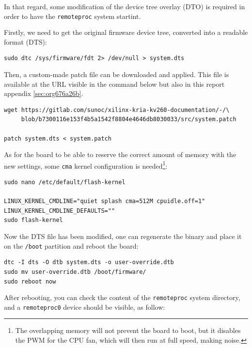 \documentclass[10pt]{article}
\begin{document}
In that regard, some modification of the device tree overlay (DTO) is required in order to have
the \texttt{remoteproc} system startint.

Firstly, we need to get the original firmware device tree, converted
into a readable format (DTS):

\begin{verbatim}
sudo dtc /sys/firmware/fdt 2> /dev/null > system.dts
\end{verbatim}

Then, a custom-made patch file can be downloaded and applied.
This file is available at the URL visible in the command below
but also in this report appendix \ref{sec:org676a26b}.

\begin{verbatim}
wget https://gitlab.com/sunoc/xilinx-kria-kv260-documentation/-/\
     blob/b7300116e153f4b5a1542f8804e4646db8030033/src/system.patch

patch system.dts < system.patch
\end{verbatim}

As for the board to be able to reserve the correct amount of memory with the new settings, some
\texttt{cma} kernel configuration is needed\footnote{The overlapping memory will not prevent the board to boot,
but it disables the PWM for the CPU fan, which will then run at full speed, making noise.}:

\begin{verbatim}
sudo nano /etc/default/flash-kernel

LINUX_KERNEL_CMDLINE="quiet splash cma=512M cpuidle.off=1"
LINUX_KERNEL_CMDLINE_DEFAULTS=""
sudo flash-kernel
\end{verbatim}

Now the DTS file has been modified, one can regenerate the binary and place it on the \texttt{/boot} partition
and reboot the board:

\begin{verbatim}
dtc -I dts -O dtb system.dts -o user-override.dtb
sudo mv user-override.dtb /boot/firmware/
sudo reboot now
\end{verbatim}

After rebooting, you can check the content of the \verb|remoteproc| system directory,
and a \texttt{remoteproc0} device should be visible, as follow:
\end{document}
